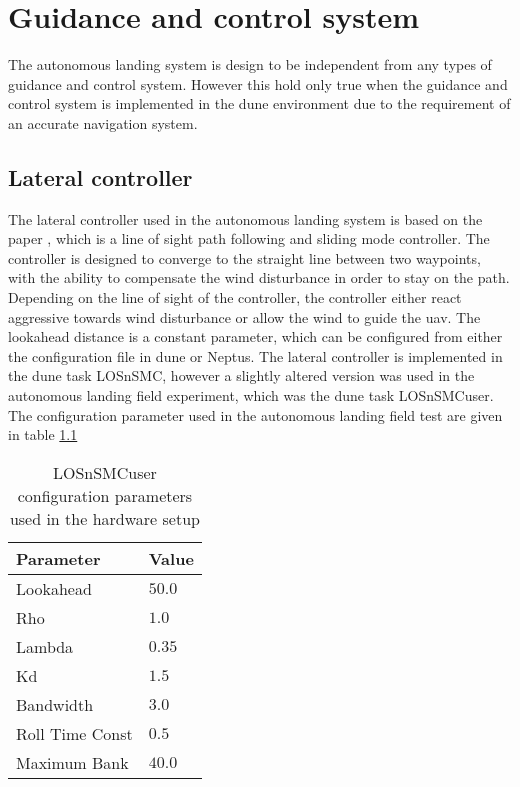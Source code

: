 \chapter{Guidance and control system}\label{AP:ControlGuidanceSystem}
The autonomous landing system is design to be independent from any types of guidance and control system. However this hold only true when the guidance and control system is implemented in the \gls{dune} environment due to the requirement of an accurate navigation system. 
\section{Lateral controller}
The lateral controller used in the autonomous landing system is based on the paper \citep{fortuna2015cascaded}, which is a line of sight path following and sliding mode controller. The controller is designed to converge to the straight line between two waypoints, with the ability to compensate the wind disturbance in order to stay on the path. Depending on the line of sight of the controller, the controller either react aggressive towards wind disturbance or allow the wind to guide the \gls{uav}. The lookahead distance is a constant parameter, which can be configured from either the configuration file in \gls{dune} or Neptus. The lateral controller is implemented in the \gls{dune} task LOSnSMC, however a slightly altered version was used in the autonomous landing field experiment, which was the \gls{dune} task LOSnSMCuser. The configuration parameter used in the autonomous landing field test are given in table \ref{AP:TB:LOSnSMCuser} 

\begin{table}[H]
\centering
\begin{tabular}{| l | l |}
\hline
\textbf{Parameter}	&	\textbf{Value} \\ \hline
Lookahead           &                    $50.0$ \\ \hline
Rho                 &                    $1.0$ \\ \hline
Lambda				&                    $0.35$ \\ \hline
Kd					&                    $1.5$ \\ \hline
Bandwidth			&                    $3.0$ \\ \hline
Roll Time Const		&                    $0.5$ \\ \hline
Maximum Bank		&                    $40.0$ \\ \hline
\end{tabular}
\caption{LOSnSMCuser configuration parameters used in the hardware setup}
\label{AP:TB:LOSnSMCuser}
\end{table}
